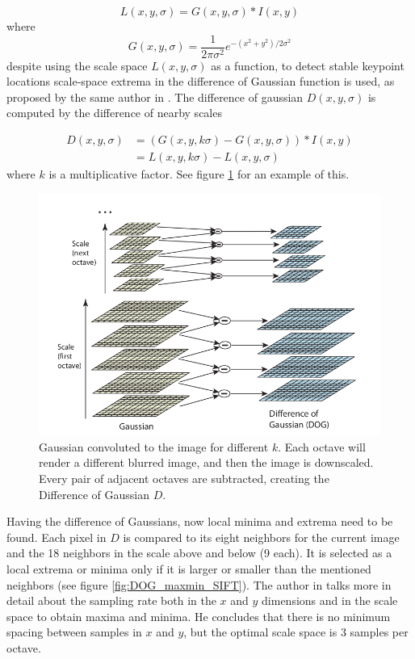 \documentclass[../main.tex]{subfiles}
\begin{document}
\begin{equation}
    L(x, y, \sigma)=G(x, y, \sigma) * I(x, y)
\end{equation}
where
\begin{equation}
    G(x, y, \sigma)=\frac{1}{2 \pi \sigma^{2}} e^{-\left(x^{2}+y^{2}\right) / 2 \sigma^{2}}
\end{equation}
despite using the scale space $L(x,y,\sigma)$ as a function, to detect stable keypoint locations scale-space extrema in the difference of Gaussian function is used, as proposed by the same author in \cite{Lowe1999}. The difference of gaussian $D(x,y,\sigma)$ is computed by the difference of nearby scales

\begin{equation}
    \begin{aligned}
    D(x, y, \sigma) &=(G(x, y, k \sigma)-G(x, y, \sigma)) * I(x, y) \\
    &=L(x, y, k \sigma)-L(x, y, \sigma)
    \end{aligned}
\end{equation}
where $k$ is a multiplicative factor. See figure \ref{fig:scale_space_SIFT} for an example of this.
\begin{figure}[htbp]
    \centering
    \includegraphics[width=0.9\linewidth]{images/scale_space_SIFT.png}
    \caption{Gaussian convoluted to the image for different $k$. Each octave will render a different blurred image, and then the image is downscaled. Every pair of adjacent octaves are subtracted, creating the Difference of Gaussian $D$.}
    \label{fig:scale_space_SIFT}
\end{figure}

Having the difference of Gaussians, now local minima and extrema need to be found. Each pixel in $D$ is compared to its eight neighbors for the current image and the 18 neighbors in the scale above and below (9 each). It is selected as a local extrema or minima only if it is larger or smaller than the mentioned neighbors (see figure \ref{fig:DOG_maxmin_SIFT}). The author in \cite{SIFTlowe2004} talks more in detail about the sampling rate both in the $x$ and $y$ dimensions and in the scale space to obtain maxima and minima. He concludes that there is no minimum spacing between samples in $x$ and $y$, but the optimal scale space is 3 samples per octave.
\end{document}
